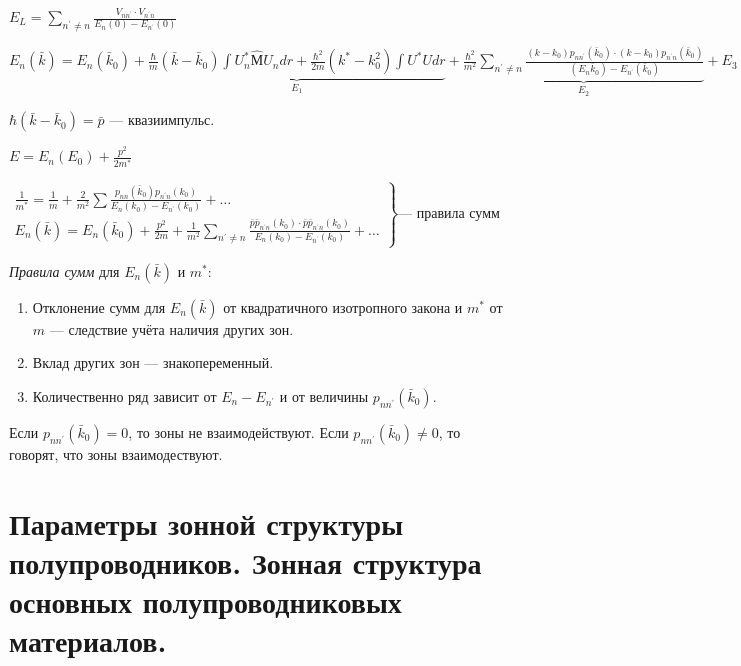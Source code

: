 $E_L=\sum_{n^{\prime} \neq n} \frac{V_{n n^{\prime}} \cdot V_{n^{\prime} n}}{E_n(0)-E_{n^{\prime}}(0)}$

$E_n(\bar{k})=E_n\left(\bar{k}_0\right)+\underbrace{\frac{\hbar}{m}\left(\bar{k}-\bar{k}_0\right) \int U_n^* \hat{М} U_n d r+\frac{\hbar^2}{2 m}\left(k^*-k_0^2\right) \int U^* U d r}_{E_1} + \underbrace{\frac{\hbar^2}{m^2} \sum_{n^{\prime} \neq n} \frac{\left(k-k_0\right) p_{n n^{\prime}}\left(\bar{k}_0\right) \cdot\left(k-k_0\right) p_{n^{\prime} n}\left(\bar{k}_0\right)}{\left(E_n \bar{k}_0\right)-E_{n^{\prime}}\left(\bar{k}_0\right)}}_{E_2} + E_3+ \ldots$

$\hbar (\bar{k}-\bar{k}_0)=\bar{p}$ --- квазиимпульс.

$E=E_n\left(E_0\right)+\frac{p^2}{2 m^*}$

$\displaystyle 
\left.\begin{array}{l}\frac{1}{m^*}=\frac{1}{m}+\frac{2}{m^2} \sum \frac{p_{n n}\left(\bar{k}_0\right) p_{n^\prime n}\left(k_0\right)}{E_n\left(k_0\right)-E_{n^{\prime}}\left(k_0\right)}+\ldots \\ E_n(\bar{k})=E_n\left(\bar{k}_0\right)+\frac{p^2}{2 m}+\frac{1}{m^2} \sum_{n^\prime \neq n} \frac{\bar{p} \bar{p}_{n^\prime n}\left(k_0\right) \cdot \bar{p} \bar{p}_{n^\prime n }\left(k_0\right)}{E_n\left(k_0\right)-E_{n^\prime}\left(k_0\right)}+\ldots\end{array}\right\} \text{--- правила сумм}$

\textit{Правила сумм} для $E_n(\bar{k})$ и $m^*$:

\begin{enumerate}
    \item Отклонение сумм для $E_n(\bar{k})$ от квадратичного изотропного закона и $m^*$ от $m$ --- следствие учёта наличия других зон.
    \item Вклад других зон --- знакопеременный.
    \item Количественно ряд зависит от $E_n-E_{n^\prime}$ и от величины $p_{nn^\prime}(\bar{k}_0)$.
\end{enumerate}

Если $p_{nn^\prime}(\bar{k}_0)=0$, то зоны не взаимодействуют. Если $p_{nn^\prime}(\bar{k}_0)\neq 0$, то говорят, что зоны взаимодествуют.


\section{Параметры зонной структуры полупроводников. Зонная структура основных полупроводниковых материалов.}

